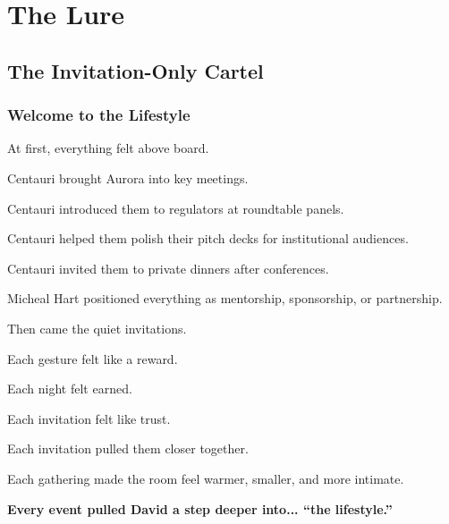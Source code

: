\section{The Lure}

\subsection{The Invitation-Only Cartel}

\subsubsection{Welcome to the Lifestyle}

At first, everything felt above board.

Centauri brought Aurora into key meetings.  

Centauri introduced them to regulators at roundtable panels.  

Centauri helped them polish their pitch decks for institutional audiences.  

Centauri invited them to private dinners after conferences.

Micheal Hart positioned everything as mentorship, sponsorship, or partnership.

Then came the quiet invitations.

Each gesture felt like a reward. 

Each night felt earned. 

Each invitation felt like trust.

Each invitation pulled them closer together. 

Each gathering made the room feel warmer, smaller, and more intimate.  

\textbf{Every event pulled David a step deeper into... ``the lifestyle.''}

\medskip


